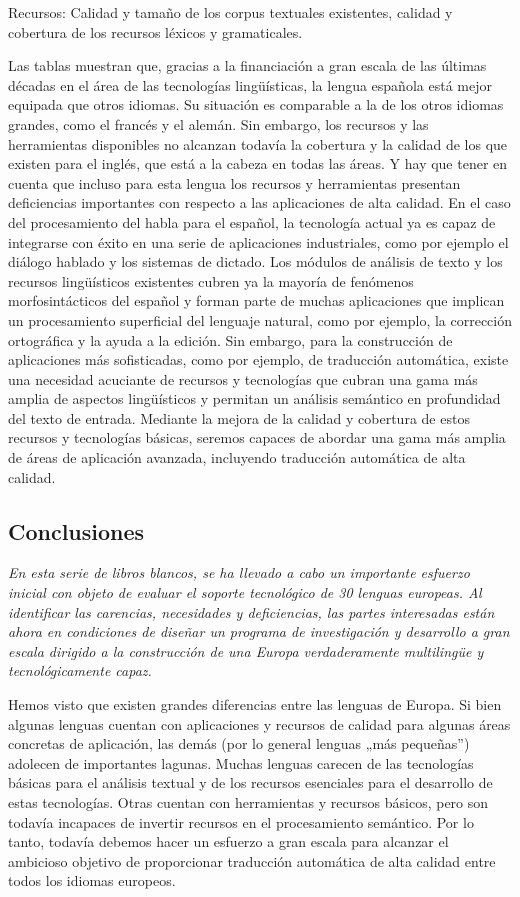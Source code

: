 \begin{multicols}{2}
Recursos: Calidad y tamaño de los corpus textuales existentes, calidad y cobertura de los recursos léxicos y gramaticales.

Las tablas muestran que, gracias a la financiación a gran escala de las últimas décadas en el área de las tecnologías lingüísticas, la lengua española está mejor equipada que otros idiomas. Su situación es comparable a la de los otros idiomas  grandes, como el francés y el alemán. Sin embargo, los recursos y las herramientas disponibles no alcanzan todavía la cobertura y la calidad de los que existen para el inglés, que está a la cabeza en todas las áreas. Y hay que tener en cuenta que  incluso para esta lengua los recursos y herramientas presentan deficiencias importantes con respecto a las aplicaciones de alta calidad.
En el caso del procesamiento del habla para el español, la tecnología actual ya es capaz de integrarse con éxito en una serie de aplicaciones industriales, como por ejemplo el diálogo hablado y los sistemas de dictado. Los módulos de análisis de texto y los recursos lingüísticos existentes cubren ya la mayoría de fenómenos morfosintácticos del español y forman parte de muchas aplicaciones que implican un procesamiento superficial del lenguaje natural, como por ejemplo, la corrección ortográfica y la ayuda a la edición.
Sin embargo, para la construcción de aplicaciones más sofisticadas, como por ejemplo, de traducción automática, existe una necesidad acuciante de recursos y tecnologías que cubran una gama más amplia de aspectos lingüísticos y permitan un análisis semántico en profundidad del texto de entrada. Mediante la mejora de la calidad y cobertura de estos recursos y tecnologías básicas, seremos capaces de abordar una gama más amplia de áreas de aplicación avanzada, incluyendo traducción automática de alta calidad.

\subsection{Conclusiones}

\emph{En esta serie de libros blancos, se ha llevado a cabo un importante esfuerzo inicial con objeto de evaluar el soporte tecnológico de 30 lenguas europeas. Al identificar las carencias, necesidades y deficiencias, las partes interesadas están ahora en condiciones de diseñar un programa de investigación y desarrollo a gran escala dirigido a la construcción de una Europa verdaderamente multilingüe y tecnológicamente capaz.}

Hemos visto que existen grandes diferencias entre las lenguas de Europa. Si bien algunas lenguas cuentan con aplicaciones y recursos de calidad para algunas áreas concretas de aplicación, las demás (por lo general lenguas „más pequeñas”) adolecen de importantes lagunas. Muchas lenguas carecen de las tecnologías básicas para el análisis textual y de los recursos esenciales para el desarrollo de estas tecnologías. Otras cuentan con herramientas y recursos básicos, pero son todavía incapaces de invertir recursos en el procesamiento semántico. Por lo tanto, todavía debemos hacer un esfuerzo a gran escala para alcanzar el ambicioso objetivo de proporcionar traducción automática de alta calidad entre todos los idiomas europeos.


\end{multicols}
